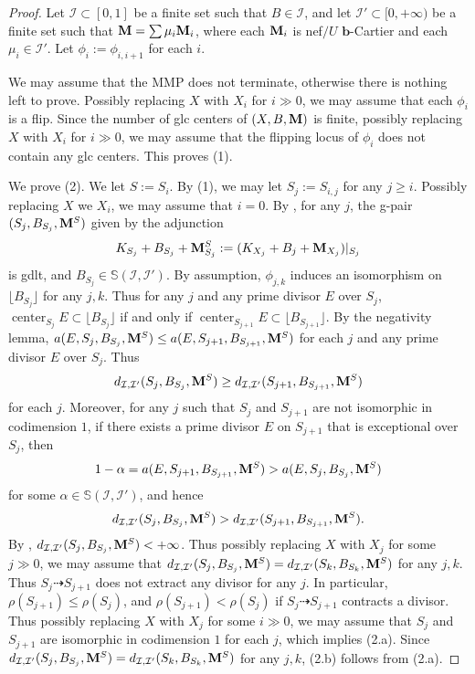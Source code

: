 \documentclass[11pt]{amsart}
\numberwithin{equation}{section}
\newcommand{\bb}{\bm{b}}
\newcommand{\Mm}{{\bf{M}}}
\newcommand{\Center}{\operatorname{center}}
\newcommand{\Ii}{\mathcal{I}}
\theoremstyle{definition}
\theoremstyle{definition}
\theoremstyle{definition}
\begin{document}
\begin{proof}
Let $\Ii\subset [0,1]$ be a finite set such that $B\in\Ii$, and let $\Ii'\subset [0,+\infty)$ be a finite set such that $\Mm=\sum \mu_i\Mm_i$, where each $\Mm_i$ is nef$/U$ $\bb$-Cartier and each $\mu_i\in\Ii'$. Let $\phi_i:=\phi_{i,i+1}$ for each $i$.

We may assume that the MMP does not terminate, otherwise there is nothing left to prove. Possibly replacing $X$ with $X_i$ for $i\gg 0$, we may assume that each $\phi_i$ is a flip. Since the number of glc centers of $(X,B,\Mm)$ is finite, possibly replacing $X$ with $X_i$ for $i\gg 0$, we may assume that the flipping locus of $\phi_i$ does not contain any glc centers. This proves (1). 

We prove (2). We let $S:=S_i$. By (1), we may let $S_j:=S_{i,j}$ for any $j\geq i$. Possibly replacing $X$ we $X_i$, we may assume that $i=0$. By \cite[Proposition 2.8]{HL18}, for any $j$, the g-pair $(S_j,B_{S_j},\Mm^{S})$ given by the adjunction
$$K_{S_j}+B_{S_j}+\Mm_{S_j}^S:=(K_{X_j}+B_j+\Mm_{X_j})|_{S_j}$$
is gdlt, and $B_{S_j}\in\mathbb S(\Ii,\Ii')$. By assumption, $\phi_{j,k}$ induces an isomorphism on $\lfloor B_{S_j}\rfloor$ for any $j,k$. Thus for any $j$ and any prime divisor $E$ over $S_j$, $\Center_{S_j}E\subset\lfloor B_{S_j}\rfloor$ if and only if $\Center_{S_{j+1}}E\subset\lfloor B_{S_{j+1}}\rfloor$. By the negativity lemma, $a(E,S_j,B_{S_j},\Mm^{S})\leq a(E,S_{j+1},B_{S_{j+1}},\Mm^{S})$ for each $j$ and any prime divisor $E$ over $S_j$. Thus
$$d_{\Ii,\Ii'}(S_j,B_{S_j},\Mm^{S})\geq d_{\Ii,\Ii'}(S_{j+1},B_{S_{j+1}},\Mm^{S})$$
for each $j$. Moreover, for any $j$ such that $S_j$ and $S_{j+1}$ are not isomorphic in codimension $1$,  if there exists a prime divisor $E$ on $S_{j+1}$ that is exceptional over $S_j$, then $$1-\alpha=a(E,S_{j+1},B_{S_{j+1}},\Mm^{S})>a(E,S_j,B_{S_j},\Mm^{S})$$ for some $\alpha\in\mathbb S(\Ii,\Ii')$, and hence $$d_{\Ii,\Ii'}(S_j,B_{S_j},\Mm^{S})> d_{\Ii,\Ii'}(S_{j+1},B_{S_{j+1}},\Mm^{S}).$$
By \cite[Remark 4.4]{HL18}, $d_{\Ii,\Ii'}(S_j,B_{S_j},\Mm^{S})<+\infty$. Thus possibly replacing $X$ with $X_j$ for some $j\gg 0$, we may assume that
$d_{\Ii,\Ii'}(S_j,B_{S_j},\Mm^{S})=d_{\Ii,\Ii'}(S_k,B_{S_k},\Mm^{S})$ for any $j,k$. Thus $S_j\dashrightarrow S_{j+1}$ does not extract any divisor for any $j$. In particular, $\rho(S_{j+1})\leq \rho(S_j)$, and $\rho(S_{j+1})<\rho(S_j)$ if $S_j\dashrightarrow S_{j+1}$ contracts a divisor. Thus possibly replacing $X$ with $X_j$ for some $i\gg 0$, we may assume that  $S_j$ and $S_{j+1}$ are isomorphic in codimension $1$ for each $j$, which implies (2.a). Since $d_{\Ii,\Ii'}(S_j,B_{S_j},\Mm^{S})=d_{\Ii,\Ii'}(S_k,B_{S_k},\Mm^{S})$ for any $j,k$, (2.b) follows from (2.a).


\end{proof}
\end{document}
